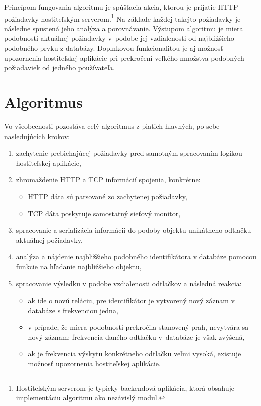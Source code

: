 \documentclass[
  printed, %
  table,   %
  lof,     %
  nolot,   %
  nocover
]{fithesis3}
\begin{document}
Princípom fungovania algoritmu je spúšťacia akcia, ktorou je prijatie HTTP požiadavky
hostiteľským serverom.\footnote{Hostiteľským serverom je typicky backendová
aplikácia, ktorá obsahuje implementáciu algoritmu ako nezávislý modul.} Na
základe každej takejto požiadavky je následne spustená jeho analýza a
porovnávanie. Výstupom algoritmu je miera podobnosti aktuálnej
požiadavky v~podobe jej vzdialenosti od najbližšieho podobného prvku
z databázy. Doplnkovou funkcionalitou je aj možnosť upozornenia hostiteľskej
aplikácie pri prekročení veľkého množstva podobných požiadaviek od jedného používateľa.

\section{Algoritmus}
Vo všeobecnosti pozostáva celý algoritmus z piatich hlavných, po sebe nasledujúcich krokov:
\begin{enumerate}
  \item zachytenie prebiehajúcej požiadavky pred samotným spracovaním logikou hostiteľskej aplikácie,
  \item zhromaždenie HTTP a TCP informácií spojenia, konkrétne:
  \begin{itemize}
    \item HTTP dáta sú parsované zo zachytenej požiadavky,
    \item TCP dáta poskytuje samostatný sieťový monitor,
  \end{itemize}
  \item spracovanie a serializácia informácií do podoby objektu unikátneho odtlačku
  aktuálnej požiadavky,
  \item analýza a nájdenie najbližšieho podobného identifikátora v databáze pomocou funkcie na
  hľadanie najbližšieho objektu,
  \item spracovanie výsledku v podobe vzdialenosti odtlačkov a následná reakcia:
  \begin{itemize}
    \item ak ide o novú reláciu, pre identifikátor je vytvorený nový záznam v databáze s frekvenciou jedna,
    \item v prípade, že miera podobnosti prekročila stanovený prah, nevytvára
    sa nový záznam; frekvencia daného odtlačku v~databáze je však zvýšená,
    \item ak je frekvencia výskytu konkrétneho odtlačku veľmi vysoká, existuje
    možnosť upozornenia hostiteľskej aplikácie.
  \end{itemize}
\end{enumerate}
\end{document}
